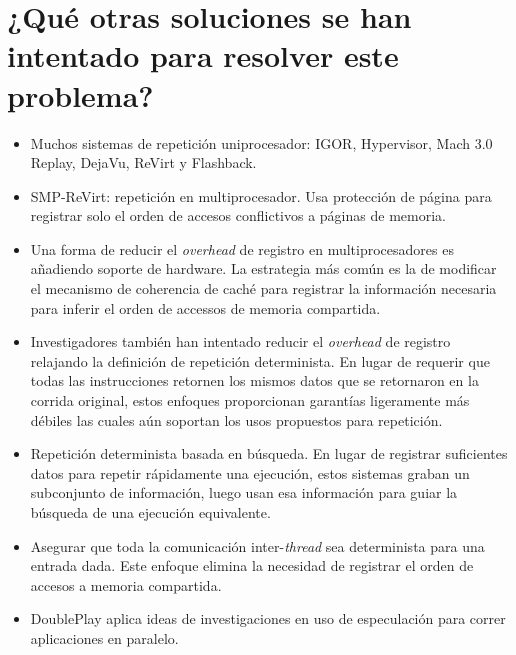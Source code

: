 \section{¿Qué otras soluciones se han intentado para resolver este problema?}
\begin{itemize}
    \item Muchos sistemas de repetición uniprocesador: IGOR, Hypervisor, Mach 3.0 Replay, DejaVu, ReVirt y Flashback.
    \item SMP-ReVirt: repetición en multiprocesador. Usa protección de página para registrar solo el orden de accesos conflictivos a páginas de memoria.
    \item Una forma de reducir el \emph{overhead} de registro en multiprocesadores es añadiendo soporte de hardware. La estrategia más común es la de modificar el mecanismo de coherencia de caché para registrar la información necesaria para inferir el orden de accessos de memoria compartida.
    \item Investigadores también han intentado reducir el \emph{overhead} de registro relajando la definición de repetición determinista. En lugar de requerir que todas las instrucciones retornen los mismos datos que se retornaron en la corrida original, estos enfoques proporcionan garantías ligeramente más débiles las cuales aún soportan los usos propuestos para repetición.
    \item Repetición determinista basada en búsqueda. En lugar de registrar suficientes datos para repetir rápidamente una ejecución, estos sistemas graban un subconjunto de información, luego usan esa información para guiar la búsqueda de una ejecución equivalente. 
    \item Asegurar que toda la comunicación inter-\emph{thread} sea determinista para una entrada dada. Este enfoque elimina la necesidad de registrar el orden de accesos a memoria compartida.
    \item DoublePlay aplica ideas de investigaciones en uso de especulación para correr aplicaciones en paralelo.
\end{itemize}

     
